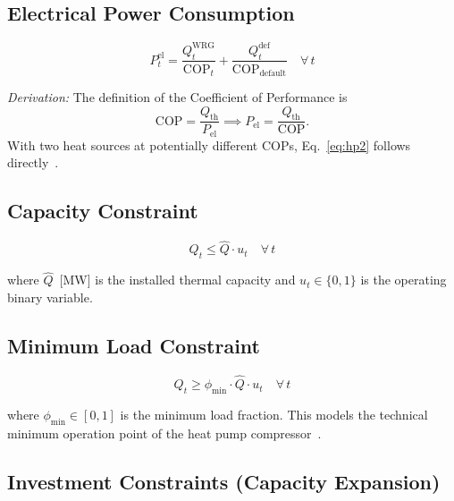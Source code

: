 \documentclass[a4paper,12pt]{article}
\newcommand{\COP}{\mathrm{COP}}
\begin{document}
\subsection{Electrical Power Consumption}

\begin{equation}
  P^{\text{el}}_{t}
  = \frac{Q^{\text{WRG}}_{t}}{\COP_{t}}
    + \frac{Q^{\text{def}}_{t}}{\COP_{\text{default}}}
  \quad \forall\, t
  \tag{HP-2}
  \label{eq:hp2}
\end{equation}

\noindent\textit{Derivation:} The definition of the Coefficient of Performance is
\[
  \COP = \frac{Q_{\text{th}}}{P_{\text{el}}}
  \implies
  P_{\text{el}} = \frac{Q_{\text{th}}}{\COP}.
\]
With two heat sources at potentially different COPs, Eq.~\eqref{eq:hp2} follows
directly~\cite{Viessmann2021,Berghmans2012}.

\subsection{Capacity Constraint}

\begin{equation}
  Q_{t} \leq \hat{Q} \cdot u_{t}
  \quad \forall\, t
  \tag{HP-3}
  \label{eq:hp3}
\end{equation}

where $\hat{Q}$~[MW] is the installed thermal capacity and $u_{t} \in \{0,1\}$ is the
operating binary variable.

\subsection{Minimum Load Constraint}

\begin{equation}
  Q_{t} \geq \phi_{\min} \cdot \hat{Q} \cdot u_{t}
  \quad \forall\, t
  \tag{HP-4}
  \label{eq:hp4}
\end{equation}

where $\phi_{\min} \in [0,1]$ is the minimum load fraction. This models the technical
minimum operation point of the heat pump compressor~\cite{Wolf2014}.

\subsection{Investment Constraints (Capacity Expansion)}
\end{document}
